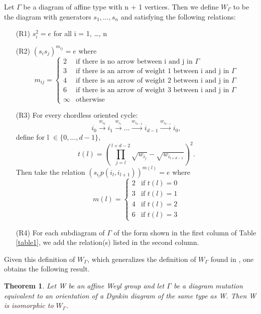 \documentclass[11pt]{amsart}
\newtheorem{thm}{Theorem}[section]
\theoremstyle{definition}
\begin{document}
\begin{def}\cite[Definition 4.1]{FT13}
Let $\Gamma$ be a diagram of affine type with n + 1 vertices. Then we define $W_{\Gamma}$ to be the diagram with generators $s_{1}, \dots, s_{n}$ and satisfying the following relations:
\begin{enumerate}
\item[(R1)] $s_{i}^{2} = e$ for all i = 1, \dots, n
\item[(R2)] $(s_{i}s_{j})^{m_{ij}} = e$ where 
$$m_{ij} = 
\begin{cases}
2 &\text{if there is no arrow between i and j in $\Gamma$} \\
3 &\text{if there is an arrow of weight 1 between i and j in $\Gamma$} \\
4 &\text{if there is an arrow of weight 2 between i and j in $\Gamma$} \\
6 &\text{if there is an arrow of weight 3 between i and j in $\Gamma$} \\
\infty &\text{otherwise}
\end{cases}$$
\item[(R3)] For every chordless oriented cycle:
$$i_{0} \stackrel{w_{i_{0}}}{\longrightarrow} i_{1} \stackrel{w_{i_{1}}}{\longrightarrow} \dots \stackrel{w_{i_{d-2}}}{\longrightarrow} i_{d-1} \stackrel{w_{i_{d-1}}}{\longrightarrow} i_{0},$$
define for l $\in \{0, \dots, d-1\}$, 
$$t(l) = (\prod_{j=l}^{l+d-2}{\sqrt{w_{i_{j}}}} - \sqrt{w_{i_{l+d-1}}})^{2}.$$
Then take the relation $(s_{i_{l}}p(i_{l}, i_{l+1}))^{m(l)} = e$ where
$$m(l) =
\begin{cases}
2 &\text{if $t(l)=0$} \\
3 &\text{if $t(l)=1$} \\
4 &\text{if $t(l)=2$} \\
6 &\text{if $t(l)=3$}
\end{cases}$$
\item[(R4)] For each subdiagram of $\Gamma$ of the form shown in the first column of Table \ref{table1}, we add the relation(s) listed in the second column.
\end{enumerate}
\end{def}

Given this definition of $W_{\Gamma}$, which generalizes the definition of $W_{\Gamma}$ found in \cite{BM13}, one obtains the following result.

\begin{thm} \cite[Theorem 4.6]{FT13}
Let W be an affine Weyl group and let $\Gamma$ be a diagram mutation equivalent to an orientation of a Dynkin diagram of the same type as W. Then W is isomorphic to $W_{\Gamma}$.
\end{thm}
\end{document}
